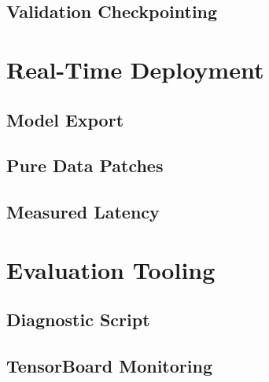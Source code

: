 \subsection{Validation Checkpointing}

\section{Real-Time Deployment}
\label{sec:impl_realtime}

\subsection{Model Export}

\subsection{Pure Data Patches}

\subsection{Measured Latency}

\section{Evaluation Tooling}
\label{sec:impl_eval}

\subsection{Diagnostic Script}

\subsection{TensorBoard Monitoring}
